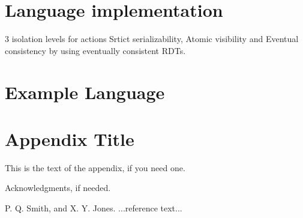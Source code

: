 \documentclass[preprint, numbers]{sigplanconf}
\begin{document}
\section{Language implementation}
3 isolation levels for actions Srtict serializability, Atomic visibility and
Eventual consistency by using eventually consistent RDTs. 

%
%
%
\section{Example Language}
\appendix
\section{Appendix Title}

This is the text of the appendix, if you need one.

\acks

Acknowledgments, if needed.





\begin{thebibliography}{}
\softraggedright

P. Q. Smith, and X. Y. Jones. ...reference text...

\end{thebibliography}
\end{document}
